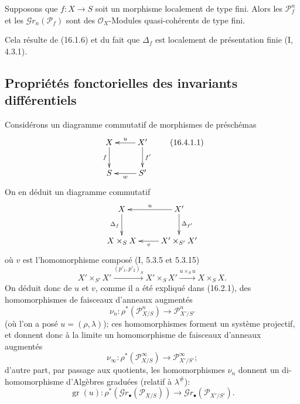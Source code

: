 \begin{proposition}[16.3.9]
\label{IV.16.3.9}
Supposons que $f:X\to S$ soit un morphisme localement de type fini. Alors les
$\mathscr{P}_f^n$ et les $\mathscr{G}r_n(\mathscr{P}_f)$ sont des
$\mathcal{O}_X$-Modules quasi-cohérents de type fini.
\end{proposition}

Cela résulte de (16.1.6) et du fait que $\Delta_f$ est localement de présentation
finie (I, 4.3.1).

\subsection{Propriétés fonctorielles des invariants différentiels}
\label{IV.16.4}

\begin{env}[16.4.1]
\label{IV.16.4.1}
Considérons un diagramme commutatif de morphismes de préschémas
\[
  \xymatrix{
    X \ar[d]_-{f} & X' \ar[l]_-u \ar[d]^-{f'} \\
    S & S' \ar[l]^-w
  }
  \tag{16.4.1.1}
  \label{IV.16.4.1.1}
\]
On en déduit un diagramme commutatif
\[
  \xymatrix{
    X \ar[d]_-{\Delta_f} & X' \ar[l]_-u \ar[d]^-{\Delta_{f'}} \\
    X\times_S X & X'\times_{S'}X' \ar[l]^-v
  }
\]
où $v$ est l'homomorphisme composé (I, 5.3.5 et 5.3.15)
\[
  X'\times_{S'}X'
  \xrightarrow{(p'_1,p'_2)_S}X'\times_S X'
  \xrightarrow{u\times_S u}X\times_S X.
  \tag{16.4.1.2}
  \label{IV.16.4.1.2}
\]
On déduit donc de $u$ et $v$, comme il a été expliqué dans (16.2.1), des
homomorphismes de faisceaux d'anneaux augmentés
\[
  \nu_n:\rho^*(\mathscr{P}_{X/S}^n)\longrightarrow
  \mathscr{P}_{X'/S'}^n
  \tag{16.4.1.3}
  \label{IV.16.4.1.3}
\]
(où l'on a posé $u=(\rho,\lambda)$); ces homomorphismes forment un système
projectif, et donnent donc à la limite un homomorphisme de faisceaux d'anneaux
augmentés
\[
  \nu_\infty:\rho^*(\mathscr{P}_{X/S}^\infty)\longrightarrow
  \mathscr{P}_{X'/S'}^\infty;
  \tag{16.4.1.4}
  \label{IV.16.4.1.4}
\]
d'autre part, par passage aux quotients, les homomorphismes $\nu_n$ donnent un
di-homomorphisme d'Algèbres graduées (relatif à $\lambda^\#$):
\[
  \operatorname{gr}(u):\rho^*(\mathscr{G}r_\bullet(\mathscr{P}_{X/S}))
  \longrightarrow\mathscr{G}r_\bullet(\mathscr{P}_{X'/S'}).
  \tag{16.4.1.5}
  \label{IV.16.4.1.5}
\]
\end{env}

